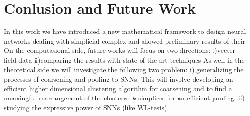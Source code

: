 \section{Conlusion and Future Work}

In this work we have introduced a new mathematical framework to design neural networks dealing with simplicial complex and showed preliminary results of their
On the computational side, future works will focus on two directions: i)vector field data ii)comparing the results with state of the art techniques
As well in the theoretical side we will investigate the following two problem: i) generalizing the processes of coarsening and pooling to SNNs. This will involve developing an efficient higher dimensional clustering algorithm for coarsening and to find a meaningful rearrangement of the clustered $k$-simplices for an efficient pooling. ii) studying the expressive power of SNNs (like WL-tests)  




